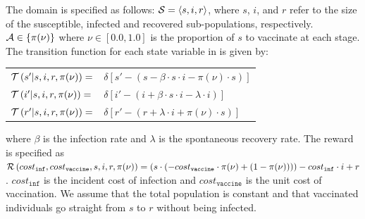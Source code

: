 The domain is specified as follows: {\footnotesize $ \mathcal{S} = \left\langle s, i, r \right\rangle$}, where $ s $, $ i $, and $ r $ refer to the size of the susceptible, infected and recovered sub-populations, respectively. {\footnotesize $ \mathcal{A} \in \left\lbrace \pi(\nu) \right\rbrace $} where {\footnotesize $\nu \in \left[0.0, 1.0\right]$} is the proportion of $ s $ to vaccinate at each stage. The transition function {\footnotesize \Transition} for each state variable in {\footnotesize \State} is given by:
    {\footnotesize 
        \abovedisplayskip=5pt
        \belowdisplayskip=0pt
        \renewcommand{\arraystretch}{1.5}
        \begin{tabular}{ll}
            $ \mathcal{T}\left( s' | s, i, r, \pi(\nu) \right) =$ & $ \delta \left[ s' - (s - \beta \cdot s \cdot i - \pi(\nu) \cdot s) \right] $ \\
            $ \mathcal{T}\left( i' | s, i, r, \pi(\nu) \right) =$ & $ \delta \left[ i' - (i + \beta \cdot s \cdot i - \lambda \cdot i) \right] $ \\
            $ \mathcal{T}\left( r' | s, i, r, \pi(\nu) \right) =$ & $ \delta \left[ r' - (r + \lambda \cdot i + \pi(\nu) \cdot s) \right] $ \\            
        \end{tabular}
    }%
where {\footnotesize $ \beta $} is the infection rate and {\footnotesize $\lambda$} is the spontaneous recovery rate. The reward is specified as {\footnotesize $ \mathcal{R}\left(cost_{\mathtt{inf}}, cost_{\mathtt{vaccine}}, s, i, r, \pi(\nu) \right) = (s \cdot (-cost_{\mathtt{vaccine}} \cdot \pi(\nu) + (1 - \pi(\nu)))) - cost_{\mathtt{inf}} \cdot i + r$}. {\footnotesize $ cost_{\mathtt{inf}} $} is the incident cost of infection
and {\footnotesize $ cost_{\mathtt{vaccine}} $} is the unit cost of vaccination. We assume that the total population is constant and that vaccinated individuals go straight from {\footnotesize $ s $} to {\footnotesize $ r $} without being infected. 


